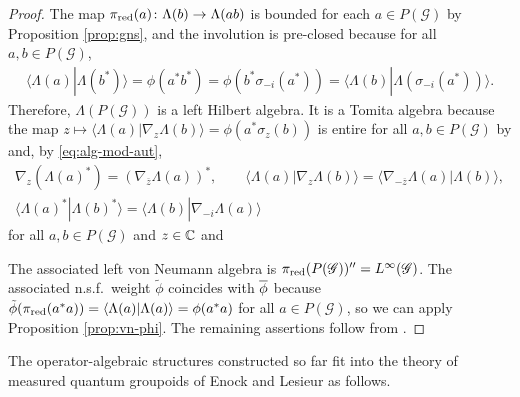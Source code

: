 \begin{proof}
The map $\pi_{\operatorname{\mathrm{red}}}(a)\colon \Lambda(b) \to \Lambda(ab)$ is bounded for
  each $a \in P(\mathscr{G})$ by Proposition \ref{prop:gns}, and the
  involution is pre-closed because for all $a,b \in P(\mathscr{G})$,
  \begin{align*}
    \langle \Lambda(a)|\Lambda(b^{*})\rangle = \phi(a^{*}b^{*}) =
    \phi(b^{*}\sigma_{-i}(a^{*})) = \langle
    \Lambda(b)|\Lambda(\sigma_{-i}(a^{*}))\rangle.
  \end{align*}
  Therefore, $\Lambda(P(\mathscr{G}))$ is a left Hilbert algebra. It
  is a Tomita algebra because the
  map $z\mapsto \langle \Lambda(a)|\nabla_{z}\Lambda(b)\rangle =
  \phi(a^{*}\sigma_{z}(b))$ is entire for all $a,b\in P(\mathscr{G})$  by
 \cite[Theorem 2.25]{DCT1}
  and, by \eqref{eq:alg-mod-aut}, 
  \begin{gather*}
    \nabla_{z}(\Lambda(a)^{*}) = (\nabla_{\overline{z}}\Lambda(a))^{*}, \qquad
    \langle \Lambda(a)|\nabla_{z}\Lambda(b)\rangle = \langle
    \nabla_{-\overline{z}}\Lambda(a) |\Lambda(b)\rangle, \\ \langle
    \Lambda(a)^{*}|\Lambda(b)^{*}\rangle = \langle \Lambda(b)|\nabla_{-i}\Lambda(a)\rangle
  \end{gather*}
  for all $a,b\in P(\mathscr{G})$ and $z\in \mathbb{C}$ and   

 The associated left von Neumann algebra is $\pi_{\operatorname{\mathrm{red}}}(P(\mathscr{G}))''=L^{\infty}(\mathscr{G})$. The
 associated n.s.f.\ weight $\tilde\phi$ coincides with $\overline{\phi}$ because
 $\tilde \phi(\pi_{\operatorname{\mathrm{red}}}(a^{*}a))=\langle\Lambda(a)|\Lambda(a)\rangle =
 \phi(a^{*}a)$ for all $a\in P(\mathscr{G})$, so we can apply Proposition \ref{prop:vn-phi}. The remaining
 assertions follow  from
  \cite[Theorem VI.2.2 and its proof]{Taksak2}.
\end{proof}


The operator-algebraic structures constructed so far fit into the
theory of measured quantum groupoids of Enock and Lesieur \cite{Eno2,Les1} as follows.

